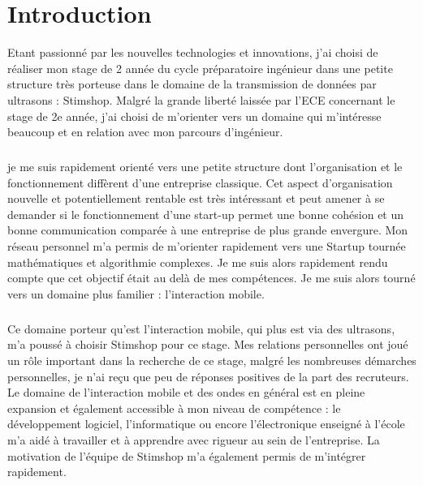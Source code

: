\documentclass[12pt]{report}
\begin{document}
\renewcommand{\contentsname}{Sommaire}
\tableofcontents

\chapter*{Introduction}

Etant passionné par les nouvelles technologies et innovations, j'ai choisi de réaliser mon stage de 2\ieme{} année du cycle préparatoire ingénieur dans une petite structure très porteuse dans le domaine de la transmission de données par ultrasons : Stimshop. Malgré la grande liberté laissée par l'ECE concernant le stage de 2e année, j'ai choisi de m'orienter vers un domaine qui m'intéresse beaucoup et en relation avec mon parcours d'ingénieur. 

\paragraph{}
je me suis rapidement orienté vers une petite structure dont l'organisation et le fonctionnement diffèrent d'une entreprise classique. Cet aspect d'organisation nouvelle et potentiellement rentable est très intéressant et peut amener à se demander si le fonctionnement d'une start-up permet une bonne cohésion et un bonne communication comparée à une entreprise de plus grande envergure. Mon réseau personnel m'a permis de m'orienter rapidement vers une Startup tournée mathématiques et algorithmie complexes. Je me suis alors rapidement rendu compte que cet objectif était au delà de mes compétences. Je me suis alors tourné vers un domaine plus familier :  l'interaction mobile. 

\paragraph{}
Ce domaine porteur qu'est l'interaction mobile, qui plus est via des ultrasons, m'a poussé à choisir Stimshop pour ce stage. Mes relations personnelles ont joué un rôle important dans la recherche de ce stage, malgré les nombreuses démarches personnelles, je n'ai reçu que peu de réponses positives de la part des recruteurs. Le domaine de l'interaction mobile et des ondes en général est en pleine expansion et également accessible à mon niveau de compétence : le développement logiciel, l'informatique ou encore l'électronique enseigné à l'école m'a aidé à travailler et à apprendre avec rigueur au sein de l'entreprise. La motivation de l'équipe de Stimshop m'a également permis de m'intégrer rapidement. 
\end{document}
